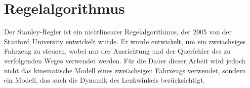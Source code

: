 \documentclass[arbeit=studie,oneside,BCOR=12mm]{ArbeitRST}
\begin{document}
\chapter{Regelalgorithmus}

%
%
%

Der Stanley-Regler ist ein nichtlinearer Regelalgorithmus, der 2005 von der
Stanford University entwickelt wurde. Er wurde entwickelt, um ein zweiachsiges 
Fahrzeug zu steuern, wobei nur der Ausrichtung und der Querfehler des zu verfolgenden 
Weges verwendet werden. Für die Dauer dieser Arbeit wird jedoch nicht das 
kinematische Modell eines zweiachsigen Fahrzeugs verwendet, sondern ein Modell,
das auch die Dynamik des Lenkwinkels berücksichtigt.
\end{document}
